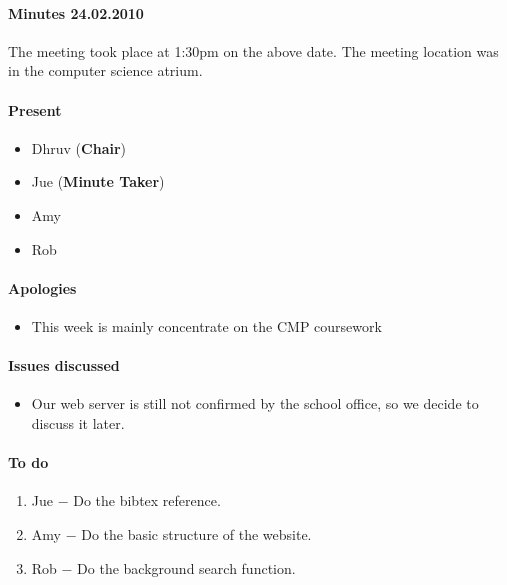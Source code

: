 \paragraph{Minutes 24.02.2010}  
The meeting took place at 1:30pm on the above date. The meeting location was in the computer science atrium. 

\paragraph{Present}

\begin{itemize}
	\item Dhruv (\textbf{Chair})
	\item Jue (\textbf{Minute Taker})
	\item Amy
	\item Rob
	
	
\end{itemize}

\paragraph{Apologies}

\begin{itemize}
	\item This week is mainly concentrate on the CMP coursework
\end{itemize}

\paragraph{Issues discussed}

\begin{itemize}
	\item Our web server is still not confirmed by the school office, so we decide to discuss it later.
	
\end{itemize}

\paragraph{To do}

\begin{enumerate}
	\item Jue $-$ Do the bibtex reference. 
	\item Amy $-$ Do the basic structure of the website.
	\item Rob $-$ Do the background search function.
\end{enumerate}